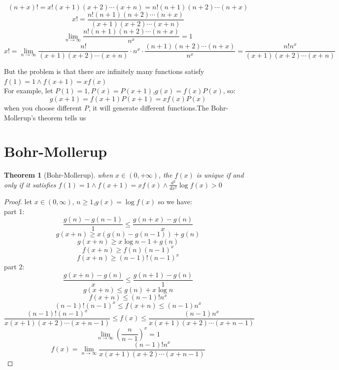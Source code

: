\documentclass[10pt,a4paper]{article}
\newtheorem{theorem}{Theorem}[section]
\begin{document}
\[(n+x)!=x!(x+1)(x+2)\cdots(x+n)=n!(n+1)(n+2)\cdots(n+x)\]
\[x!=\frac{n!(n+1)(n+2)\cdots(n+x)}{(x+1)(x+2)\cdots(x+n)}\]
\[\lim_{n\to\infty}\frac{n!(n+1)(n+2)\cdots(n+x)}{n^x}=1\]
\[x!=\lim_{n\to\infty}\frac{n!}{(x+1)(x+2)\cdots(x+n)}\cdot n^x\cdot\frac{(n+1)(n+2)\cdots(n+x)}{n^x}=\frac{n!n^x}{(x+1)(x+2)\cdots(x+n)}\]

But the problem is that there are infinitely many functions satisfy $f(1)=1\land f(x+1)=xf(x)$\\
For  example, let $P(1)=1,P(x)=P(x+1)$,$g(x)=f(x)P(x)$, so:\[g(x+1)=f(x+1)P(x+1)=xf(x)P(x)\]
when you choose different $P$, it will generate different functions.The Bohr-Mollerup's theorem tells us
\section{Bohr-Mollerup}
\begin{theorem}[Bohr-Mollerup]
    when $x\in (0,+\infty)$, the $f(x)$ is unique if and only if it satisfies $f(1)=1\land f(x+1)=xf(x)\land \frac{d^2}{dx^2}\log{f(x)}>0$
\end{theorem}
\begin{proof}
    let $x\in(0,\infty)$, $n\ge 1$,$g(x)=\log{f(x)}$ so we have:\\
    part 1: \[\frac{g(n)-g(n-1)}{1}\le\frac{g(n+x)-g(n)}{x}\]
    \[g(x+n)\ge x(g(n)-g(n-1))+g(n)\]
    \[g(x+n)\ge x\log{n-1}+g(n)\]
    \[f(x+n)\ge f(n)(n-1)^x\]
    \[f(x+n)\ge (n-1)!(n-1)^x\]
    part 2:\[\frac{g(x+n)-g(n)}{x}\le\frac{g(n+1)-g(n)}{1}\]
    \[g(x+n)\le g(n)+x\log{n}\]
    \[f(x+n)\le(n-1)!n^x\]
    \[(n-1)!(n-1)^x\le f(x+n)\le(n-1)n^x\]
    \[\frac{(n-1)!(n-1)^x}{x(x+1)(x+2)\cdots(x+n-1)}\le f(x)\le\frac{(n-1)n^x}{x(x+1)(x+2)\cdots(x+n-1)}\]
    \[\lim_{n\to\infty}(\frac{n}{n-1})^x=1\]
    \[f(x)=\lim_{n\to\infty}\frac{(n-1)!n^x}{x(x+1)(x+2)\cdots(x+n-1)}\]
\end{proof}
\end{document}
